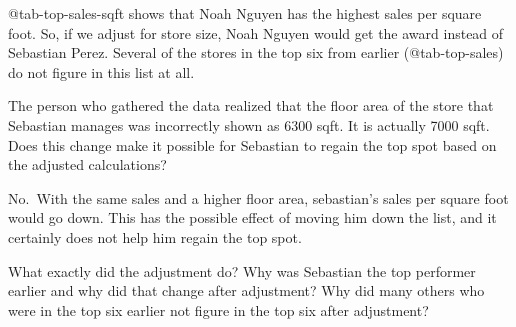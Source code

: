 \documentclass[
  12pt,
  letterpaper,
  DIV=11,
  numbers=noendperiod]{scrreprt}
\begin{document}
@tab-top-sales-sqft shows that Noah Nguyen has the highest sales per
square foot. So, if we adjust for store size, Noah Nguyen would get the
award instead of Sebastian Perez. Several of the stores in the top six
from earlier (@tab-top-sales) do not figure in this list at all.

\begin{tcolorbox}[enhanced jigsaw, colback=white, leftrule=.75mm, toprule=.15mm, bottomtitle=1mm, breakable, coltitle=black, toptitle=1mm, title={Quick Check}, opacitybacktitle=0.6, colbacktitle=quarto-callout-note-color!10!white, arc=.35mm, left=2mm, colframe=quarto-callout-note-color-frame, titlerule=0mm, rightrule=.15mm, bottomrule=.15mm, opacityback=0]

The person who gathered the data realized that the floor area of the
store that Sebastian manages was incorrectly shown as 6300 sqft. It is
actually 7000 sqft. Does this change make it possible for Sebastian to
regain the top spot based on the adjusted calculations?

\end{tcolorbox}

\begin{tcolorbox}[enhanced jigsaw, colback=white, leftrule=.75mm, toprule=.15mm, bottomtitle=1mm, breakable, coltitle=black, toptitle=1mm, title={Suggested answer}, opacitybacktitle=0.6, colbacktitle=quarto-callout-note-color!10!white, arc=.35mm, left=2mm, colframe=quarto-callout-note-color-frame, titlerule=0mm, rightrule=.15mm, bottomrule=.15mm, opacityback=0]

No.~With the same sales and a higher floor area, sebastian's sales per
square foot would go down. This has the possible effect of moving him
down the list, and it certainly does not help him regain the top spot.

\end{tcolorbox}

\begin{tcolorbox}[enhanced jigsaw, colback=white, leftrule=.75mm, toprule=.15mm, bottomtitle=1mm, breakable, coltitle=black, toptitle=1mm, title={Quick Check}, opacitybacktitle=0.6, colbacktitle=quarto-callout-note-color!10!white, arc=.35mm, left=2mm, colframe=quarto-callout-note-color-frame, titlerule=0mm, rightrule=.15mm, bottomrule=.15mm, opacityback=0]

What exactly did the adjustment do? Why was Sebastian the top performer
earlier and why did that change after adjustment? Why did many others
who were in the top six earlier not figure in the top six after
adjustment?

\end{tcolorbox}
\end{document}
